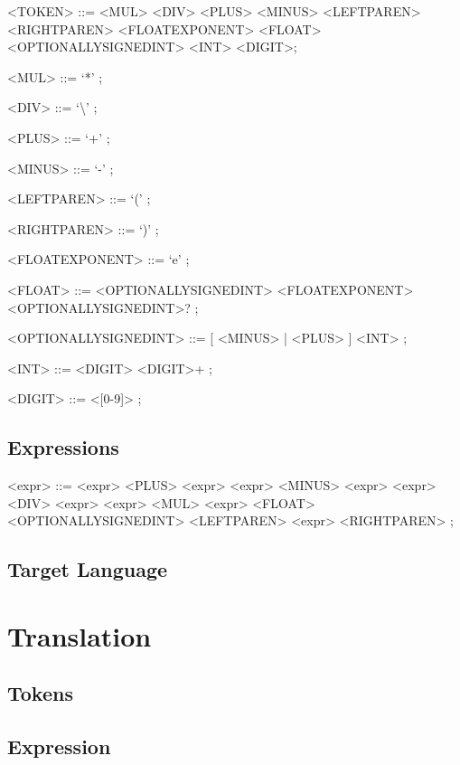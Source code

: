 \documentclass[a4paper,12pt]{article}
\begin{document}
\begin{grammar}
<TOKEN> ::= <MUL> <DIV> <PLUS> <MINUS> <LEFTPAREN> <RIGHTPAREN> <FLOATEXPONENT> <FLOAT> <OPTIONALLYSIGNEDINT> <INT> <DIGIT>;

<MUL> ::= `*' ;

<DIV> ::= `\textbackslash' ;

<PLUS> ::= `+' ;

<MINUS> ::= `-' ;

<LEFTPAREN> ::= `(' ;

<RIGHTPAREN> ::= `)' ;

<FLOATEXPONENT> ::= `e' ;

<FLOAT> ::= <OPTIONALLYSIGNEDINT> <FLOATEXPONENT> <OPTIONALLYSIGNEDINT>? ;

<OPTIONALLYSIGNEDINT> ::= [ <MINUS> | <PLUS> ] <INT> ;

<INT> ::= <DIGIT> <DIGIT>+ ;

<DIGIT> ::= <[0-9]> ;


\end{grammar}
\subsection{Expressions}

\begin{grammar}

<expr> ::= <expr> <PLUS> <expr> 
\alt <expr> <MINUS> <expr> 
\alt <expr> <DIV> <expr> 
\alt <expr> <MUL> <expr> 
\alt <FLOAT> 
\alt <OPTIONALLYSIGNEDINT> 
\alt <LEFTPAREN> <expr> <RIGHTPAREN> ;

\end{grammar}
\subsection{Target Language}
\section{Translation}
\subsection{Tokens}
\subsection{Expression}
\end{document}
